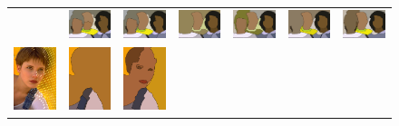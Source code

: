 \begin{figure}[tb]
\begin{center}
\begin{tabular}{ c  c  c  c  c  c  c }
&\includegraphics[width=2cm]{fig/visual_result/visual_result_5_2.png}
&\includegraphics[width=2cm]{fig/visual_result/visual_result_5_3.png}
&\includegraphics[width=2cm]{fig/visual_result/visual_result_5_4.png}
&\includegraphics[width=2cm]{fig/visual_result/visual_result_5_5.png}
&\includegraphics[width=2cm]{fig/visual_result/visual_result_5_6.png}
&\includegraphics[width=2cm]{fig/visual_result/visual_result_5_7.png}
\\
\includegraphics[width=2cm]{fig/visual_result/visual_result_6_1.png}
&\includegraphics[width=2cm]{fig/visual_result/visual_result_6_2.png}
&\includegraphics[width=2cm]{fig/visual_result/visual_result_6_3.png}

\end{tabular}
\end{center}
\end{figure}
